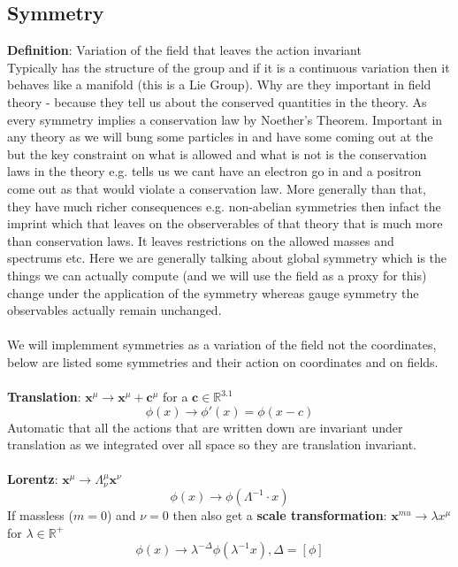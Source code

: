\documentclass[12pt, a4paper, twoside, titlepage]{article}
\begin{document}
\subsection{Symmetry}
\textbf{Definition}: Variation of the field that leaves the action invariant\\
Typically has the structure of the group and if it is a continuous variation then it behaves like a manifold (this is a Lie Group). Why are they important in field theory - because they tell us about the conserved quantities in the theory. As every symmetry implies a conservation law by Noether's Theorem. Important in any theory as we will bung some particles in and have some coming out at the but the key constraint on what is allowed and what is not is the conservation laws in the theory e.g. tells us we cant have an electron go in and a positron come out as that would violate a conservation law. More generally than that, they have much richer consequences e.g. non-abelian symmetries then infact the imprint which that leaves on the observerables of that theory that is much more than conservation laws. It leaves restrictions on the allowed masses and spectrums etc. Here we are generally talking about global symmetry which is the things we can actually compute (and we will use the field as a proxy for this) change under the application of the symmetry whereas gauge symmetry the observables actually remain unchanged.\\\\ We will implemment symmetries as a variation of the field not the coordinates, below are listed some symmetries and their action on coordinates and on fields. \\\\

\textbf{Translation}: $\bm x^{\mu} \rightarrow \bm x^{\mu} + \bm c^{\mu}$ for a $\bm c \in \mathbb{R}^{3.1}$
$$
\phi(x) \rightarrow \phi'(x) = \phi(x - c)
$$
Automatic that all the actions that are written down are invariant under translation as we integrated over all space so they are translation invariant.\\\\
\textbf{Lorentz}: $\bm x^{\mu} \rightarrow \Lambda^{\mu}_{\nu}\bm x^{\nu}$
$$
\phi(x) \rightarrow \phi(\Lambda^{-1} \cdot x)
$$
If massless ($m=0$) and $\nu = 0$ then also get a \textbf{scale transformation}: $\bm x^{mu} \rightarrow \lambda x^{\mu}$ for $\lambda \in \mathbb{R}^+$
$$
\phi(x) \rightarrow \lambda^{-\Delta}\phi(\lambda^{-1} x), \Delta = [\phi]
$$
\end{document}
